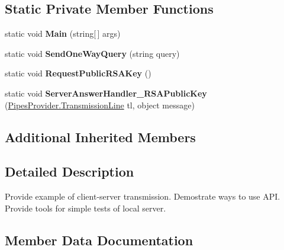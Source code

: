\subsection*{Static Private Member Functions}
\begin{DoxyCompactItemize}
\item 
\mbox{\label{class_test_client_1_1_client_a236c6c2776f2ec6851c36a8714ef6e03}} 
static void {\bfseries Main} (string\mbox{[}$\,$\mbox{]} args)
\item 
\mbox{\label{class_test_client_1_1_client_af74ca9833b73440828e078c9c25a8026}} 
static void {\bfseries Send\+One\+Way\+Query} (string query)
\item 
\mbox{\label{class_test_client_1_1_client_a0d6d95892249c5febdb5708995b7a987}} 
static void {\bfseries Request\+Public\+R\+S\+A\+Key} ()
\item 
\mbox{\label{class_test_client_1_1_client_a32396ed694c8942865f0c265a6232612}} 
static void {\bfseries Server\+Answer\+Handler\+\_\+\+R\+S\+A\+Public\+Key} (\mbox{\hyperlink{class_pipes_provider_1_1_transmission_line}{Pipes\+Provider.\+Transmission\+Line}} tl, object message)
\end{DoxyCompactItemize}
\subsection*{Additional Inherited Members}


\subsection{Detailed Description}
Provide example of client-\/server transmission. Demostrate ways to use A\+PI. Provide tools for simple tests of local server. 



\subsection{Member Data Documentation}
\mbox{\label{class_test_client_1_1_client_a7fdac87931c97ce7fde6c4fc622bcfa6}} 
